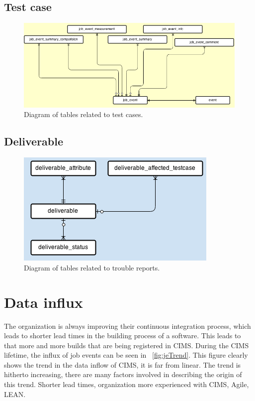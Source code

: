 \subsection{Test case}
\begin{figure}[h!]
\centering
\includegraphics[scale=0.5]{figure/job_event.png}
\caption{Diagram of tables related to test cases.}
\label{fig:job_event}
\end{figure}
\subsection{Deliverable}
\begin{figure}[h!]
\centering
\includegraphics[scale=0.5]{figure/deliverable.png}
\caption{Diagram of tables related to trouble reports.}
\label{fig:deliverable}
\end{figure}






\section{Data influx}

The organization is always improving their continuous integration process, which leads to shorter lead times in the building process of a software. This leads to that more and more builds that are being registered in CIMS. During the CIMS lifetime, the influx of job events can be seen in ~\ref{fig:jeTrend}. This figure clearly shows the trend in the data inflow of CIMS, it is far from linear. The trend is hitherto increasing, there are many factors involved in describing the origin of this trend. Shorter lead times, organization more experienced with CIMS, Agile, LEAN.

